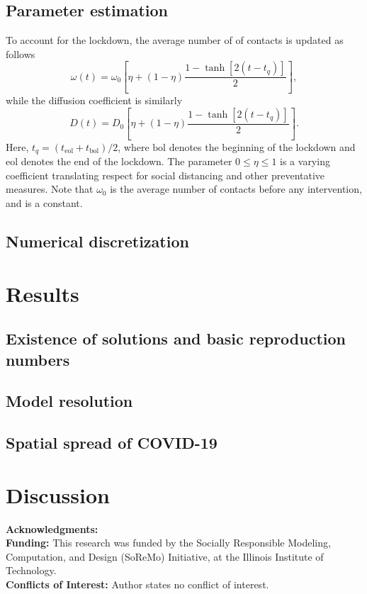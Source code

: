 \documentclass[11pt]{article}
\begin{document}
	\subsection{Parameter estimation}
		To account for the lockdown, the average number of of contacts is updated as follows \cite{Kevrekidis-2021}
		\begin{equation} \label{eq:contacts}
			\omega (t) = \omega_0 \left[ \eta + (1 - \eta) \frac{1 - \tanh \left[2 (t - t_q) \right]}{2} \right],
		\end{equation}
		while the diffusion coefficient is similarly
		\begin{equation} \label{eq:diffusion}
			D (t) = D_0 \left[ \eta + (1 - \eta) \frac{1 - \tanh \left[2 (t - t_q) \right]}{2} \right].
		\end{equation}
		Here, $t_q = (t_{\mathrm{eol}} + t_{\mathrm{bol}}) / 2$, where $\mathrm{bol}$ denotes the beginning of the lockdown and $\mathrm{eol}$ denotes the end of the lockdown.
		The parameter $0 \leq \eta \leq 1$ is a varying coefficient translating respect for social distancing and other preventative measures.
		Note that $\omega_0$ is the average number of contacts before any intervention, and is a constant.
	
	\subsection{Numerical discretization}
\section{Results}
	\subsection{Existence of solutions and basic reproduction numbers}
	
	\subsection{Model resolution}
	
	\subsection{Spatial spread of COVID-19}

\section{Discussion}
	
	\textbf{Acknowledgments:} \\
	\textbf{Funding:}
	This research was funded by the Socially Responsible Modeling, Computation, and Design (SoReMo) Initiative, at the Illinois Institute of Technology. \\
	\textbf{Conflicts of Interest:}
	Author states no conflict of interest. \\



\end{document}
